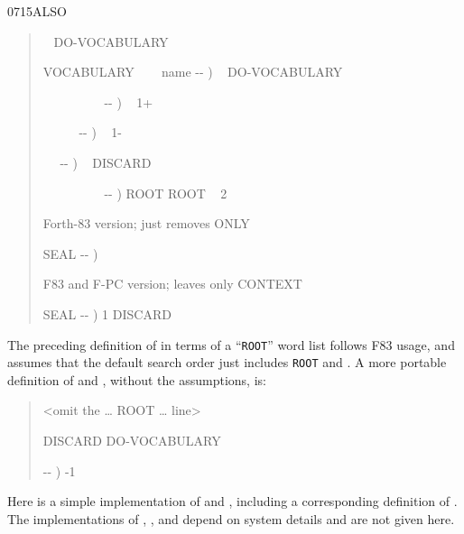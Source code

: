 \begin{worddef}{0715}{ALSO}
\begin{rationale}
\begin{quote}
		  ~
		 \word{,} DO-VOCABULARY

		\word{:} VOCABULARY ~~~ name -{}- )
			  \word{,} ~ DO-VOCABULARY
		\word{;}

		\word{:}  ~~~~~~~~~ -{}- )
			 ~ 
			 1+ 
		\word{;}

		\word{:}  ~~~~~ -{}- )
			 ~ 
			 1- 
		\word{;}

		\word{:}  ~~ -{}- )
			 ~ 
			 DISCARD
		\word{;}

		\word{:}  ~~~~~~~~~ -{}- )
			ROOT ROOT ~ 2 
		\word{;}

		 Forth-83 version; just removes ONLY

		\word{:} SEAL  -{}- )
			 
			 
		\word{;}

		 F83 and F-PC version; leaves only CONTEXT

		\word{:} SEAL  -{}- )
			 
			1  DISCARD
		\word{;}
		\end{quote}

		The preceding definition of  in terms of a
		``\texttt{ROOT}'' word list follows F83 usage, and assumes
		that the default search order just includes \texttt{ROOT} and
		. A more portable definition of  and
		, without the assumptions, is:
		\begin{quote}\ttfamily
		<omit the {\ldots}
			  ROOT
		{\ldots} line>

		  
			 \word[core]{,} DISCARD DO-VOCABULARY

		\word[core]{:}   -{}- )
			-1 
		\word[core]{;}
		\end{quote}

		Here is a simple implementation of  and
		, including a corresponding definition of
		. The implementations of ,
		,  and
		 depend on system details and are not given
		here.


\end{rationale}
\end{worddef}
